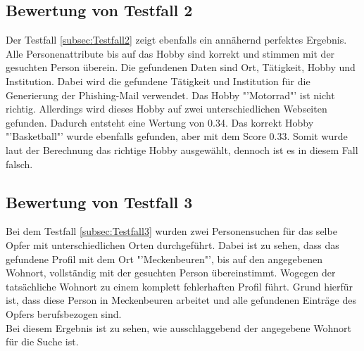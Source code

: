 	\subsection{Bewertung von Testfall 2}
	Der Testfall \ref{subsec:Testfall2} zeigt ebenfalls ein annähernd perfektes Ergebnis. Alle Personenattribute bis auf das Hobby sind korrekt und stimmen mit der gesuchten Person überein. Die gefundenen Daten sind Ort, Tätigkeit, Hobby und Institution. Dabei wird die gefundene Tätigkeit und Institution für die Generierung der Phishing-Mail verwendet. Das Hobby "'Motorrad"' ist nicht richtig. Allerdings wird dieses Hobby auf zwei unterschiedlichen Webseiten gefunden. Dadurch entsteht eine Wertung von 0.34. Das korrekt Hobby "'Basketball"' wurde ebenfalls gefunden, aber mit dem Score 0.33. Somit wurde laut der Berechnung das richtige Hobby ausgewählt, dennoch ist es in diesem Fall falsch.
	\subsection{Bewertung von Testfall 3}
	Bei dem Testfall \ref{subsec:Testfall3} wurden zwei Personensuchen für das selbe Opfer mit unterschiedlichen Orten durchgeführt. Dabei ist zu sehen, dass das gefundene Profil mit dem Ort "'Meckenbeuren"', bis auf den angegebenen Wohnort, vollständig mit der gesuchten Person übereinstimmt. Wogegen der tatsächliche Wohnort zu einem komplett fehlerhaften Profil führt. Grund hierfür ist, dass diese Person in Meckenbeuren arbeitet und alle gefundenen Einträge des Opfers berufsbezogen sind.\\
	Bei diesem Ergebnis ist zu sehen, wie ausschlaggebend der angegebene Wohnort für die Suche ist.
